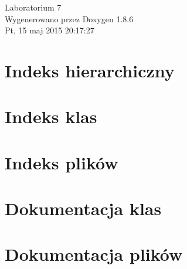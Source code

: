 \documentclass[twoside]{article}
\begin{document}
\hypersetup{pageanchor=false}
\begin{titlepage}
\vspace*{7cm}
\begin{center}%
{\Large Laboratorium 7 }\\
\vspace*{1cm}
{\large Wygenerowano przez Doxygen 1.8.6}\\
\vspace*{0.5cm}
{\small Pt, 15 maj 2015 20:17:27}\\
\end{center}
\end{titlepage}
\tableofcontents
{}
\hypersetup{pageanchor=true}

\section{Indeks hierarchiczny}

\section{Indeks klas}

\section{Indeks plików}

\section{Dokumentacja klas}
















\section{Dokumentacja plików}





































\newpage
{}
{}
\printindex
\end{document}
